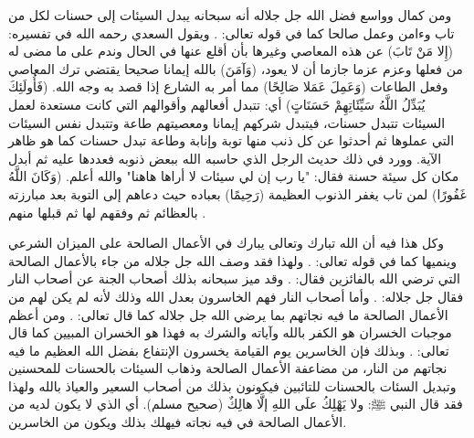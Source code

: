 ومن كمال وواسع فضل الله جل جلاله أنه سبحانه يبدل السيئات إلى حسنات لكل من تاب وءامن وعمل صالحا كما في قوله تعالى: \quranayah*[25][70]{\footnotesize \surahname*[25]}. ويقول السعدي رحمه الله في تفسيره: (إِلا مَنْ تَابَ) عن هذه المعاصي وغيرها بأن أقلع عنها في الحال وندم على ما مضى له من فعلها وعزم عزما جازما أن لا يعود، (وَآمَنَ) بالله إيمانا صحيحا يقتضي ترك المعاصي وفعل الطاعات (وَعَمِلَ عَمَلا صَالِحًا) مما أمر به الشارع إذا قصد به وجه الله. (فَأُولَئِكَ يُبَدِّلُ اللَّهُ سَيِّئَاتِهِمْ حَسَنَاتٍ) أي: تتبدل أفعالهم وأقوالهم التي كانت مستعدة لعمل السيئات تتبدل حسنات، فيتبدل شركهم إيمانا ومعصيتهم طاعة وتتبدل نفس السيئات التي عملوها ثم أحدثوا عن كل ذنب منها توبة وإنابة وطاعة تبدل حسنات كما هو ظاهر الآية. وورد في ذلك حديث الرجل الذي حاسبه الله ببعض ذنوبه فعددها عليه ثم أبدل مكان كل سيئة حسنة فقال: "يا رب إن لي سيئات لا أراها هاهنا" والله أعلم. (وَكَانَ اللَّهُ غَفُورًا) لمن تاب يغفر الذنوب العظيمة (رَحِيمًا) بعباده حيث دعاهم إلى التوبة بعد مبارزته بالعظائم ثم وفقهم لها ثم قبلها منهم \href{https://shamela.ws/book/42/1329#p5}{\faExternalLink} \cite{tafsir_Saadi}.

وكل هذا فيه أن الله تبارك وتعالى يبارك في الأعمال الصالحة على الميزان الشرعي وينميها كما في قوله تعالى: 
\quranayah*[2][261]{\footnotesize \surahname*[2]}. ولهذا فقد وصف الله جل جلاله من جاء بالأعمال الصالحة التي ترضي الله بالفائزين فقال: 
\quranayah*[24][52]{\footnotesize \surahname*[24]}.
 وقد ميز سبحانه بذلك أصحاب الجنة عن أصحاب النار فقال جل جلاله: 
\quranayah*[59][20]{\footnotesize \surahname*[59]}. وأما أصحاب النار فهم الخاسرون بعدل الله وذلك لأنه لم يكن لهم من الأعمال الصالحة ما فيه نجاتهم بما يرضي الله جل جلاله كما قال تعالى: 
\quranayah*[2][27]{\footnotesize \surahname*[2]}. ومن أعظم موجبات الخسران هو الكفر بالله وآياته والشرك به فهذا هو الخسران المبيين كما قال تعالى: 
\quranayah*[39][15]{\footnotesize \surahname*[39]}. وبذلك فإن الخاسرين يوم القيامة يخسرون الإنتفاع بفضل الله العظيم ما فيه نجاتهم من النار، من مضاعفة الأعمال الصالحة وذهاب السيئات بالحسنات للمحسنين وتبديل السئات بالحسنات للتائبين فيكونون بذلك من أصحاب السعير والعياذ بالله ولهذا فقد قال النبي ﷺ: ولا يَهْلِكُ علَى اللهِ إلَّا هالِكٌ {\footnotesize (صحيح مسلم)}. أي الذي لا يكون لديه من الأعمال الصالحة في فيه نجاته فيهلك بذلك ويكون من الخاسرين. 

